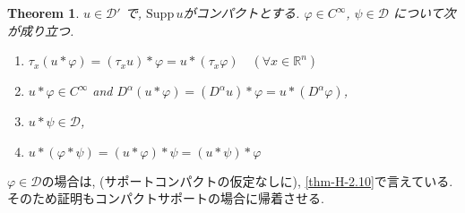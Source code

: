 \documentclass[dvipdfmx,a4paper,11pt]{article} %
\newtheorem{thm}{Theorem}[section]
\theoremstyle{definition}
\theoremstyle{remark}
\numberwithin{equation}{section}
\begin{document}
\begin{tcolorbox}[mybox]
\begin{thm}\cite[Theorem 6.35]{Rud}
\label{thm-H-3.3}
\( u \in \mathcal{D}' \) で,  \(\mathrm{Supp}\, u \)がコンパクトとする. 
\( \varphi \in C^\infty \), \( \psi \in \mathcal{D} \)
について次が成り立つ. 
\begin{enumerate}[label=$(\alph*)$]
\item \( \tau_x(u \ast \varphi) = (\tau_x u) \ast \varphi = u \ast(\tau_x \varphi) \quad (\forall x \in \mathbb{R}^n) \)
\item \( u \ast\varphi \in C^\infty \) and \( D^\alpha (u \ast \varphi) = (D^\alpha u) \ast\varphi = u \ast (D^\alpha \varphi) \),
\item \( u \ast \psi \in \mathcal{D} \),
\item \( u \ast (\varphi * \psi) = (u \ast \varphi) \ast \psi = (u \ast \psi) \ast \varphi \)
\end{enumerate}
\end{thm}

\end{tcolorbox}
\( \varphi \in \mathcal{D} \)の場合は, (サポートコンパクトの仮定なしに), \ref{thm-H-2.10}で言えている. 
そのため証明もコンパクトサポートの場合に帰着させる.
\bigskip
\end{document}
